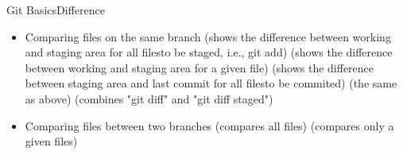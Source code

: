 \begin{frame}{Git Basics}{Difference}
\begin{itemize}
\item Comparing files on the same branch
 (shows the difference between working and staging area for all files\rightarrow to be staged, i.e., git add)
 (shows the difference between working and staging area for a given file)
 (shows the difference between staging area and last commit for all files\rightarrow to be commited)
 (the same as above)
 (combines "git diff" and "git diff \dhyphenr staged")
\item Comparing files between two branches
   (compares all files)
   (compares only a given files)
\end{itemize}
\end{frame}
